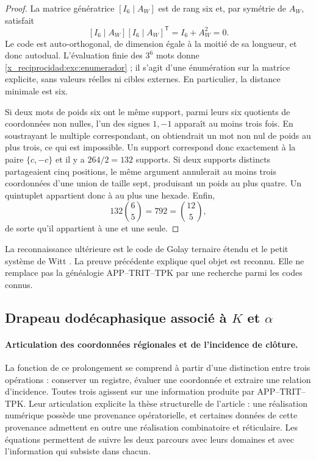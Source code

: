 \begin{proof}
La matrice génératrice $[I_6\mid A_W]$ est de rang six et, par symétrie de $A_W$, satisfait
\[
 [I_6\mid A_W][I_6\mid A_W]^{\mathsf T}
   =I_6+A_W^2=0.
\]
Le code est auto-orthogonal, de dimension égale à la moitié de sa longueur, et donc
autodual. L'évaluation finie des $3^6$ mots donne
\eqref{x_reciprocidad:exc:enumerador} ; il s'agit d'une énumération sur la matrice explicite,
sans valeurs réelles ni cibles externes. En particulier, la distance
minimale est six.

Si deux mots de poids six ont le même support, parmi leurs six quotients de coordonnées non nulles, l'un des signes $1,-1$ apparaît au moins trois fois. En soustrayant le multiple correspondant, on obtiendrait un mot non nul de poids au plus trois, ce qui est impossible. Un support correspond donc exactement à la paire $\{c,-c\}$ et il y a $264/2=132$ supports. Si deux supports distincts partageaient cinq positions, le même argument annulerait au moins trois coordonnées d'une union de taille sept, produisant un poids au plus quatre. Un quintuplet appartient donc à au plus une hexade. Enfin,
\[
 132\binom65=792=\binom{12}5,
\]
de sorte qu'il appartient à une et une seule.
\end{proof}

La reconnaissance ultérieure est le code de Golay ternaire étendu et
le petit système de Witt \cite{x_reciprocidad:conwaysloane}. La preuve précédente explique quel objet est
reconnu. Elle ne remplace pas la généalogie APP--TRIT--TPK par une recherche
parmi les codes connus.

\subsection{Drapeau dodécaphasique associé à \texorpdfstring{$K$ et $\alpha$}{K et alpha}}
\label{x_reciprocidad:exc:bandera}


\paragraph{Articulation des coordonnées régionales et de l'incidence de clôture.}
\label{x_reciprocidad:inc-ampl-articulacion}
La fonction de ce prolongement se comprend à partir d'une distinction
entre trois opérations : conserver un registre, évaluer une coordonnée et
extraire une relation d'incidence. Toutes trois agissent sur une information
produite par APP--TRIT--TPK. Leur articulation explicite la thèse
structurelle de l'article : une réalisation numérique possède une provenance
opératorielle, et certaines données de cette provenance admettent en outre une
réalisation combinatoire et réticulaire. Les équations permettent de suivre les deux
parcours avec leurs domaines et avec l'information qui subsiste dans chacun.

